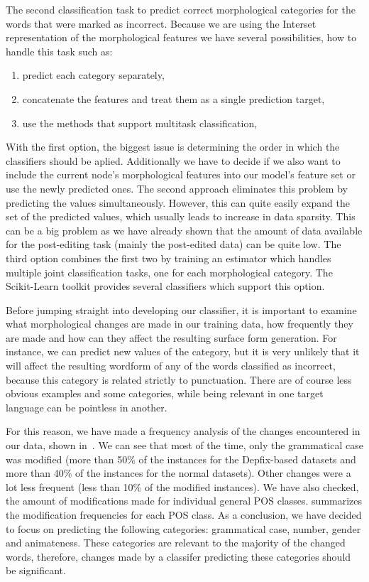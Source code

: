 The second classification task to predict correct morphological categories for
the words that were marked as incorrect. Because we are using the Interset representation
of the morphological features we have several possibilities, how to handle this task such
as:
\begin{enumerate}
    \item predict each category separately,
    \item concatenate the features and treat them as a single prediction target,
    \item use the methods that support multitask classification,
\end{enumerate}

With the first option, the biggest issue is determining the order in which the classifiers
should be aplied. Additionally we have to decide if we also want to include the current node's morphological features
into our model's feature set or use the newly predicted ones. The second approach eliminates this problem by predicting the
values simultaneously. However, this can quite easily expand the set of the predicted values,
which usually leads to increase in data sparsity. This can be a big problem as we have
already shown that the amount of data available for the post-editing task (mainly the post-edited
data) can be quite low. The third option combines the first two by training an estimator
which handles multiple joint classification tasks, one for each morphological category. The
Scikit-Learn toolkit provides several classifiers which support this option.

Before jumping straight into developing our classifier, it is important to examine what morphological
changes are made in our training data, how frequently they are made and how can they affect the resulting
surface form generation. For instance, we can predict new values of the  category,
but it is very unlikely that it will affect the resulting wordform of any of the words
classified as incorrect, because this category is related strictly to punctuation. There are
of course less obvious examples and some categories, while being relevant in one target language
can be pointless in another.

For this reason, we have made a frequency analysis of the changes encountered
in our data, shown in~. We can see that most of the time, only the grammatical
case was modified (more than 50\% of the instances for the Depfix-based datasets and more than 40\% of the instances for
the normal datasets). Other changes were a lot less frequent (less than 10\% of the modified instances).
We have also checked, the amount of modifications made for individual general POS classes.
 summarizes the modification frequencies for each
POS class. As a conclusion, we have decided to focus on predicting the following categories: grammatical case, number, gender
and animateness. These categories are relevant to the majority of the changed words, therefore, changes made by
a classifer predicting these categories should be significant.

